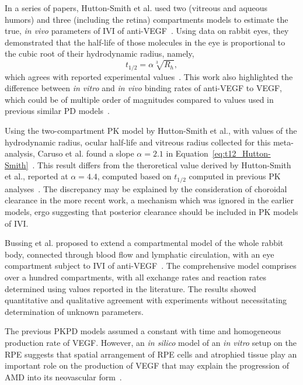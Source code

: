 \documentclass{article}
\begin{document}
In a series of papers, Hutton-Smith et al. used two (vitreous and aqueous humors) and three (including the retina) compartments models to estimate the true, \textit{in vivo} parameters of IVI of anti-VEGF~\cite{HuttonSmith_2016,HuttonSmith_2017,HuttonSmith_2018}.
Using data on rabbit eyes, they demonstrated that the half-life of those molecules in the eye is proportional to the cubic root of their hydrodynamic radius, namely,
\begin{equation}
  \label{eq:t12_Hutton-Smith}
  t_{1/2} = \alpha\sqrt[3]{R_h},
\end{equation}
which agrees with reported experimental values~\cite{HuttonSmith_2016}.
This work also highlighted the difference between \textit{in vitro} and \textit{in vivo} binding rates of anti-VEGF to VEGF, which could be of multiple order of magnitudes compared to values used in previous similar PD models~\cite{Saunders_2015}.

Using the two-compartment PK model by Hutton-Smith et al., with values of the hydrodynamic radius, ocular half-life and vitreous radius collected for this meta-analysis, Caruso et al. found a slope $\alpha=2.1$ in Equation~\ref{eq:t12_Hutton-Smith}~\cite{Caruso_2020}.
This result differs from the theroretical value derived by Hutton-Smith et al., reported at $\alpha=4.4$, computed based on $t_{1/2}$ computed in previous PK analyses~\cite{HuttonSmith_2016}.
The discrepancy may be explained by the consideration of choroidal clearance in the more recent work, a mechanism which was ignored in the earlier models, ergo suggesting that posterior clearance should be included in PK models of IVI.


Bussing et al. proposed to extend a compartmental model of the whole rabbit body, connected through blood flow and lymphatic circulation, with an eye compartment subject to IVI of anti-VEGF~\cite{Bussing_2020}.
The comprehensive model comprises over a hundred compartments, with all exchange rates and reaction rates determined using values reported in the literature.
The results showed quantitative and qualitative agreement with experiments without necessitating determination of unknown parameters. 

The previous PKPD models assumed a constant with time and homogeneous production rate of VEGF.
However, an \textit{in silico} model of an \textit{in vitro} setup on the RPE suggests that spatial arrangement of RPE cells and atrophied tissue play an important role on the production of VEGF that may explain the progression of AMD into its neovascular form~\cite{Baker_2017}.  
\end{document}
